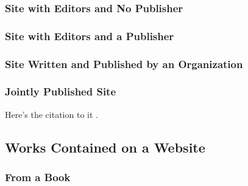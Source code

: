 \documentclass{ltxdockit}
\begin{document}
\subsubsection{Site with Editors and No Publisher} %
\label{sub:site_with_editors_and_no_publisher}
\begin{refsection}
	\printbibliography[heading=none]
\end{refsection}
\subsubsection{Site with Editors and a Publisher} %
\label{sub:site_with_editors_and_a_publisher}
\begin{refsection}
	\printbibliography[heading=none]
\end{refsection}
\subsubsection{Site Written and Published by an Organization} %
\label{sub:site_written_and_published_by_an_organization}
\begin{refsection}
	\printbibliography[heading=none]
\end{refsection}
\subsubsection{Jointly Published Site} %
\label{sub:jointly_published_site}
\begin{refsection}
	Here's the citation to it \autocite{Manifold:aa}.
	\printbibliography[heading=none]
\end{refsection}

\subsection{Works Contained on a Website} %
\label{sec:works_contained_on_a_website}
\subsubsection{From a Book} %
\label{sub:from_a_book}
\begin{refsection}
	\printbibliography[heading=none]
\end{refsection}
\end{document}
